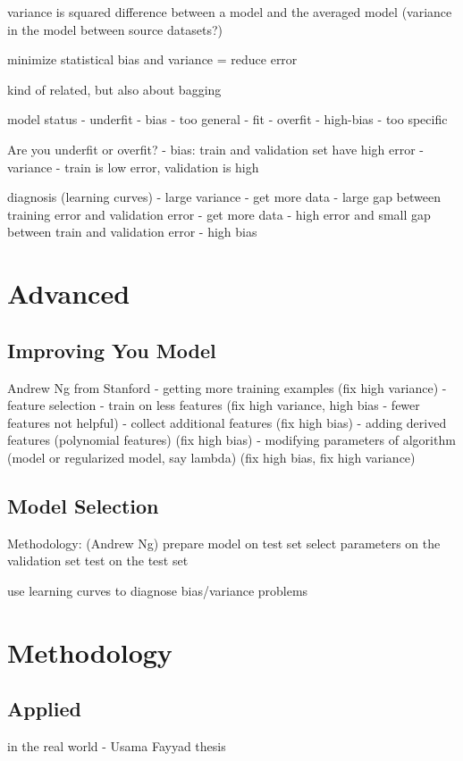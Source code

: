 \begin{bibunit}
variance is squared difference between a model and the averaged model (variance in the model between source datasets?)

minimize statistical bias and variance = reduce error


kind of related, but also about bagging \cite{Tibshirani1996a}

model status
- underfit - bias - too general
- fit
- overfit - high-bias - too specific

Are you underfit or overfit? 
- bias: train and validation set have high error
- variance - train is low error, validation is high

diagnosis (learning curves)
- large variance - get more data
- large gap between training error and validation error - get more data
- high error and small gap between train and validation error - high bias


\section{Advanced}

\subsection{Improving You Model}

Andrew Ng from Stanford
- getting more training examples (fix high variance)
- feature selection - train on less features (fix high variance, high bias - fewer features not helpful)
- collect additional features (fix high bias)
- adding derived features (polynomial features) (fix high bias)
- modifying parameters of algorithm (model or regularized model, say lambda) (fix high bias, fix high variance)


\subsection{Model Selection}

Methodology: (Andrew Ng)
prepare model on test set
select parameters on the validation set
test on the test set

use learning curves to diagnose bias/variance problems

\section{Methodology}

\subsection{Applied}
in the real world - Usama Fayyad thesis


\end{bibunit}

